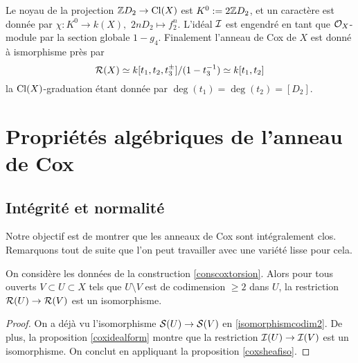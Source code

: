 \begin{ex}
Le noyau de la projection $\mathbb{Z} D_2\rightarrow \operatorname{Cl}(X)$ est $K^0:=2\mathbb{Z} D_2$, et un caractère est donnée par $\chi: K^0\rightarrow k(X),\,\,2nD_2\mapsto f_2^n$. L'idéal $\mathcal{I}$ est engendré en tant que $\mathcal{O}_X$-module par la section globale $1-g_4$. Finalement l'anneau de Cox de $X$ est donné à ismorphisme près par
$$\mathcal{R}(X)\simeq k[t_1,t_2,t_3^{\pm}]/(1-t_3^{-1})\simeq k[t_1,t_2]$$
la $\operatorname{Cl}(X)$-graduation étant donnée par $\deg(t_1)=\deg(t_2)=[D_2]$.
\end{ex}

\section{Propriétés algébriques de l'anneau de Cox} 

\subsection{Intégrité et normalité}

Notre objectif est de montrer que les anneaux de Cox sont intégralement clos. Remarquons tout de suite que l'on peut travailler avec une variété lisse pour cela.

\begin{prop}\label{isomcodime2CoxTorsion}
On considère les données de la construction \ref{conscoxtorsion}. Alors pour tous ouverts $V\subset U\subset X$ tels que $U\setminus V$ est de codimension $\geq 2$ dans $U$, la restriction $\mathcal{R}(U)\rightarrow \mathcal{R}(V)$ est un isomorphisme.
\end{prop}
\begin{proof}
On a déjà vu l'isomorphisme $\mathcal{S}(U)\rightarrow \mathcal{S}(V)$ en \ref{isomorphismcodim2}. De plus, la proposition \ref{coxidealform} montre que la restriction $\mathcal{I}(U)\rightarrow \mathcal{I}(V)$ est un isomorphisme. On conclut en appliquant la proposition \ref{coxsheafiso}.
\end{proof}

